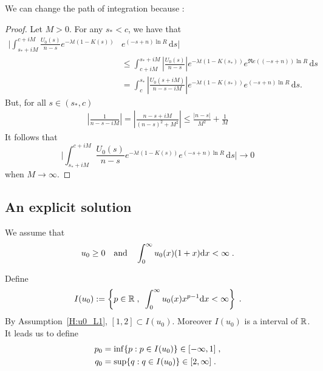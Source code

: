 \documentclass[11pt]{amsart}
\renewcommand{\Re}{\mathfrak{R}e}
\newcommand{\diff}{\,\mathrm{d}}
\begin{document}
\begin{remark}
    We can change the path of integration because : 
\end{remark}
\begin{proof}
    Let $M > 0$. For any $s_* < c$, we have that 
    \begin{align*}
        \bigg| \int_{s_*+iM}^{c+iM} \frac{U_0(s)}{n-s} e^{-\lambda t(1 - K(s))} &e^{(-s+n)\ln R} \diff s \bigg|
        \\
        &\leq 
     \int_{c+iM}^{s_*+iM} \left|\frac{U_0(s)}{n-s}\right| e^{-\lambda t(1 - K(s_*))} e^{\Re((-s+n))\ln R} \diff s \\
     &= 
     \int_{c}^{s_*} \left|\frac{U_0(s+iM)}{n-s-iM}\right| e^{-\lambda t(1 - K(s_*))} e^{(-s+n)\ln R} \diff s.
    \end{align*}
But, for all $s \in (s_*, c)$
\begin{align*}
    \left|\frac{1}{n-s-iM}\right| = \left|\frac{n-s + iM}{(n-s)^2+M^2}\right| \leq \frac{|n-s|}{M^2} + \frac1M
\end{align*}
It follows that $$ \bigg| \int_{s_*+iM}^{c+iM} \frac{U_0(s)}{n-s} e^{-\lambda t(1 - K(s))} e^{(-s+n)\ln R} \diff s \bigg| \to 0$$ when $M \to \infty$.
\end{proof}

\subsection{An explicit solution}
\label{s:explicit}

We assume that     \begin{equation}
    u_0 \geq 0 \quad \text{and} \quad \int_0^\infty u_0(x) (1+x) \mathrm dx < \infty
    \; .
    \label{H:u0_L1}
\end{equation}

Define 
\begin{equation}
    I(u_0) := \left\{ p \in \mathbb{R} \; , \enspace \int_0^\infty u_0(x) x^{p-1} \mathrm dx < \infty \right\}
    \; .
\end{equation}
By Assumption~\eqref{H:u0_L1}, $[1, 2] \subset I(u_0)$. Moreover $I(u_0)$ is a interval of $\mathbb{R}$.\\
It leads us to define
\begin{subequations}
\begin{align*}
    p_0 &= \inf \{p : p \in I(u_0) \} \in [-\infty, 1] \; ,\\
    q_0 &= \sup \{q : q \in I(u_0) \} \in [2, \infty] \; .
\end{align*}    
\end{subequations}
\end{document}
